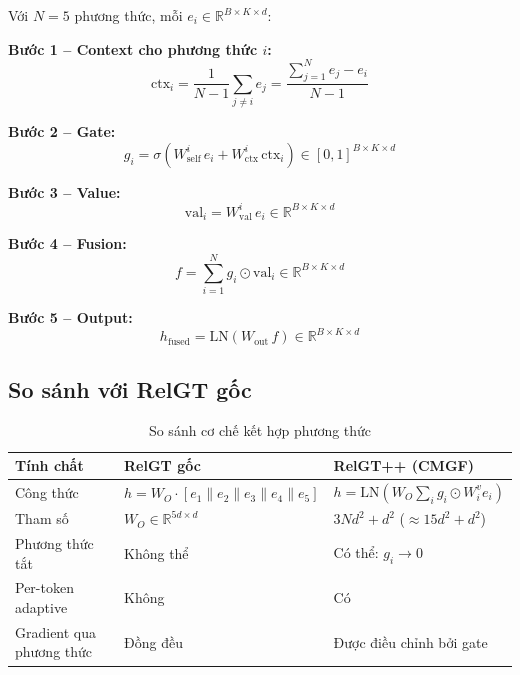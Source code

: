 \documentclass[12pt,a4paper]{article}
\begin{document}
\begin{mathbox}[title={Công thức CrossModalGatedFusion đầy đủ}]
Với $N=5$ phương thức, mỗi $e_i \in \mathbb{R}^{B \times K \times d}$:

\textbf{Bước 1 -- Context cho phương thức $i$:}
\begin{equation}
  \text{ctx}_i = \frac{1}{N-1}\sum_{j \ne i} e_j
  = \frac{\sum_{j=1}^N e_j - e_i}{N-1}
  \label{eq:cmgf_ctx}
\end{equation}

\textbf{Bước 2 -- Gate:}
\begin{equation}
  g_i = \sigma\!\left(W^i_\text{self}\, e_i + W^i_\text{ctx}\, \text{ctx}_i\right)
  \in [0,1]^{B \times K \times d}
  \label{eq:cmgf_gate}
\end{equation}

\textbf{Bước 3 -- Value:}
\begin{equation}
  \text{val}_i = W^i_\text{val}\, e_i \in \mathbb{R}^{B \times K \times d}
\end{equation}

\textbf{Bước 4 -- Fusion:}
\begin{equation}
  f = \sum_{i=1}^N g_i \odot \text{val}_i \in \mathbb{R}^{B \times K \times d}
\end{equation}

\textbf{Bước 5 -- Output:}
\begin{equation}
  \boxed{h_\text{fused} = \text{LN}\!\left(W_\text{out}\, f\right) \in \mathbb{R}^{B \times K \times d}}
  \label{eq:cmgf_out}
\end{equation}
\end{mathbox}

\subsection{So sánh với RelGT gốc}

\begin{table}[H]
\centering\small
\caption{So sánh cơ chế kết hợp phương thức}
\begin{tabular}{lll}
\toprule
\textbf{Tính chất} & \textbf{RelGT gốc} & \textbf{RelGT++ (CMGF)} \\
\midrule
Công thức & $h = W_O \cdot [e_1\|e_2\|e_3\|e_4\|e_5]$ & $h = \text{LN}(W_O \sum_i g_i \odot W_i^v e_i)$ \\
Tham số & $W_O \in \mathbb{R}^{5d \times d}$ & $3Nd^2 + d^2$ ($\approx 15d^2 + d^2$) \\
Phương thức tắt & Không thể & Có thể: $g_i \to 0$ \\
Per-token adaptive & Không & Có \\
Gradient qua phương thức & Đồng đều & Được điều chỉnh bởi gate \\
\bottomrule
\end{tabular}
\end{table}
\end{document}
